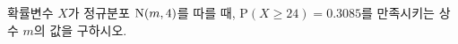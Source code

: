 확률변수 $X$가 정규분포 $\mathrm{N}(m{,}\mkern3mu\mathopen{}4)$를 따를 때, $\mathrm{P}(X\ge 24)=0.3085$를 만족시키는 상수 $m$의 값을 구하시오. 
